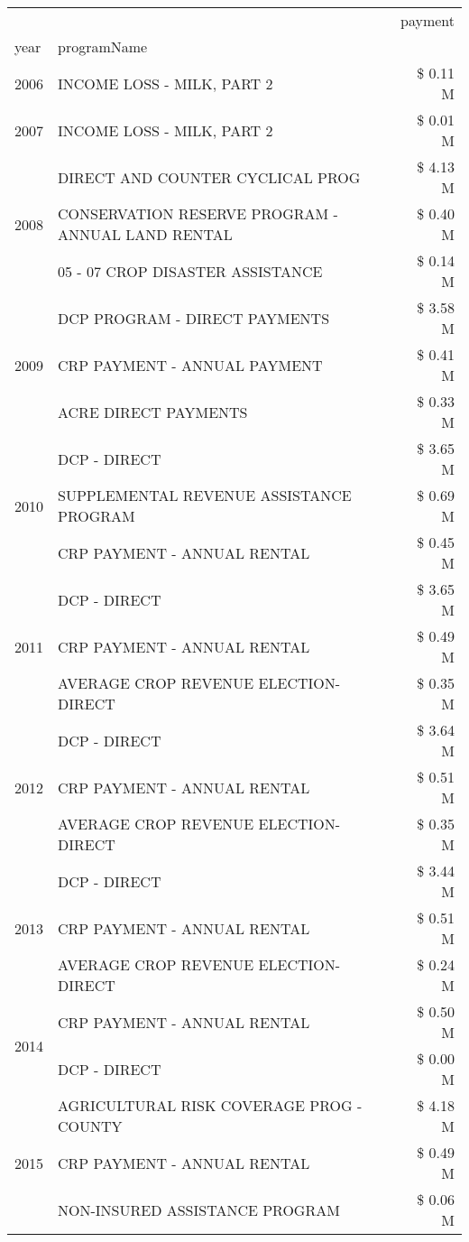 \begin{tabular}{llr}
\toprule
 &  & payment \\
year & programName &  \\
\midrule
2006 & INCOME LOSS - MILK, PART 2 & \$ 0.11 M \\
\cline{1-3}
2007 & INCOME LOSS - MILK, PART 2 & \$ 0.01 M \\
\cline{1-3}
\multirow[t]{3}{*}{2008} & DIRECT AND COUNTER CYCLICAL PROG & \$ 4.13 M \\
 & CONSERVATION RESERVE PROGRAM - ANNUAL LAND RENTAL & \$ 0.40 M \\
 & 05 - 07 CROP DISASTER ASSISTANCE & \$ 0.14 M \\
\cline{1-3}
\multirow[t]{3}{*}{2009} & DCP PROGRAM - DIRECT PAYMENTS & \$ 3.58 M \\
 & CRP PAYMENT - ANNUAL PAYMENT & \$ 0.41 M \\
 & ACRE DIRECT PAYMENTS & \$ 0.33 M \\
\cline{1-3}
\multirow[t]{3}{*}{2010} & DCP - DIRECT & \$ 3.65 M \\
 & SUPPLEMENTAL REVENUE ASSISTANCE PROGRAM & \$ 0.69 M \\
 & CRP PAYMENT - ANNUAL RENTAL & \$ 0.45 M \\
\cline{1-3}
\multirow[t]{3}{*}{2011} & DCP - DIRECT & \$ 3.65 M \\
 & CRP PAYMENT - ANNUAL RENTAL & \$ 0.49 M \\
 & AVERAGE CROP REVENUE ELECTION-DIRECT & \$ 0.35 M \\
\cline{1-3}
\multirow[t]{3}{*}{2012} & DCP - DIRECT & \$ 3.64 M \\
 & CRP PAYMENT - ANNUAL RENTAL & \$ 0.51 M \\
 & AVERAGE CROP REVENUE ELECTION-DIRECT & \$ 0.35 M \\
\cline{1-3}
\multirow[t]{3}{*}{2013} & DCP - DIRECT & \$ 3.44 M \\
 & CRP PAYMENT - ANNUAL RENTAL & \$ 0.51 M \\
 & AVERAGE CROP REVENUE ELECTION-DIRECT & \$ 0.24 M \\
\cline{1-3}
\multirow[t]{2}{*}{2014} & CRP PAYMENT - ANNUAL RENTAL & \$ 0.50 M \\
 & DCP - DIRECT & \$ 0.00 M \\
\cline{1-3}
\multirow[t]{3}{*}{2015} & AGRICULTURAL RISK COVERAGE PROG - COUNTY & \$ 4.18 M \\
 & CRP PAYMENT - ANNUAL RENTAL & \$ 0.49 M \\
 & NON-INSURED ASSISTANCE PROGRAM & \$ 0.06 M \\

\end{tabular}
